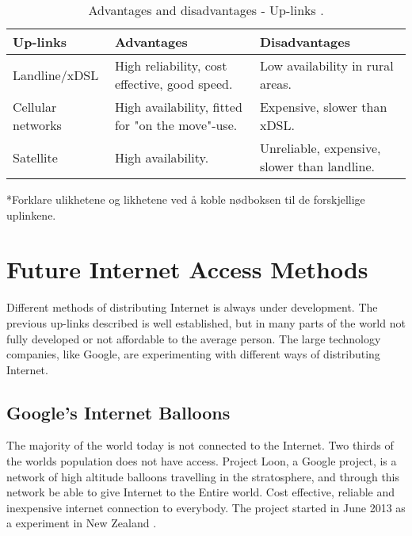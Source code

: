 \begin{center}
\begin{table}[!h]
\caption{\label{tab:uplinks}Advantages and disadvantages - Up-links \cite{comparisonuplinks}.}
    \begin{tabular}{ | l | p{4cm} | p{5cm} |}
    \hline
    \textbf{Up-links} & \textbf{Advantages} & \textbf{Disadvantages} \\ 
    \hline
    Landline/xDSL & High reliability, cost effective, good speed. & Low availability in rural areas. \\ 
    \hline
     Cellular networks & High availability, fitted for "on the move"-use. & Expensive, slower than xDSL.\\
    \hline
    Satellite & High availability.  & Unreliable, expensive, slower than landline.\\ 
    \hline
    \end{tabular}
   \end{table}
\end{center}

*Forklare ulikhetene og likhetene ved å koble nødboksen til de forskjellige uplinkene. 

\section{Future Internet Access Methods}
Different methods of distributing Internet is always under development. The previous up-links described is well established, but in many parts of the world not fully developed or not affordable to the average person. The large technology companies, like Google, are experimenting with different ways of distributing Internet. 

\subsection{Google's Internet Balloons}
The majority of the world today is not connected to the Internet. Two thirds of the worlds population does not have access. Project Loon, a Google project, is a network of high altitude balloons travelling in the stratosphere, and through this network be able to give Internet to the Entire world. Cost effective, reliable and inexpensive internet connection to everybody. The project started in June 2013 as a experiment in New Zealand \cite{loon}. 

